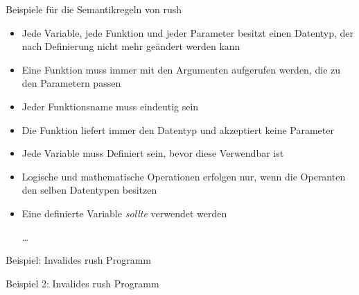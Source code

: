 \begin{frame}{Beispiele für die Semantikregeln von rush }
	\begin{itemize}
		\item Jede Variable, jede Funktion und jeder Parameter besitzt einen Datentyp, der nach Definierung nicht mehr geändert werden kann
		\item Eine Funktion muss immer mit den Argumenten aufgerufen werden, die zu den Parametern passen
		\item Jeder Funktionsname muss eindeutig sein
		\item Die  Funktion liefert immer den \qVerb{()} Datentyp und akzeptiert keine Parameter
		\item Jede Variable muss Definiert sein, bevor diese Verwendbar ist
		\item Logische und mathematische Operationen erfolgen nur, wenn die Operanten den selben Datentypen besitzen
		\item Eine definierte Variable \emph{sollte} verwendet werden
		\item[\ldots]
	\end{itemize}
\end{frame}

\begin{frame}{Beispiel: Invalides rush Programm}
	\begin{minipage}{.5\textwidth}
	\end{minipage}%
	\begin{minipage}{.5\textwidth}
	\end{minipage}
\end{frame}

\begin{frame}{Beispiel 2: Invalides rush Programm}
	\begin{minipage}{.5\textwidth}
	\end{minipage}%
	\begin{minipage}{.5\textwidth}
	\end{minipage}
\end{frame}

